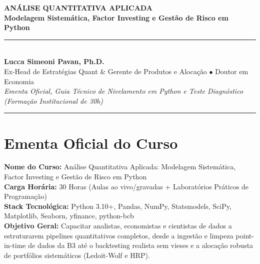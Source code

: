 \documentclass[11pt,a4paper]{article}
\begin{document}
\begin{center}
    {\Huge \textbf{\color{primarynavy} ANÁLISE QUANTITATIVA APLICADA}}\\[6pt]
    {\Large \textbf{\color{accentblue} Modelagem Sistemática, Factor Investing e Gestão de Risco em Python}}\\[10pt]
    \rule{\textwidth}{1.5pt}\\[8pt]
    {\normalsize \textbf{Lucca Simeoni Pavan, Ph.D.}}\\
    {\small Ex-Head de Estratégias Quant \& Gerente de Produtos e Alocação $\bullet$ Doutor em Economia}\\
    {\small \textit{Ementa Oficial, Guia Técnico de Nivelamento em Python e Teste Diagnóstico (Formação Institucional de 30h)}}\\[4pt]
    \rule{\textwidth}{0.8pt}
\end{center}

\vspace{10pt}

\section{Ementa Oficial do Curso}

\begin{infobox}
\textbf{Nome do Curso:} Análise Quantitativa Aplicada: Modelagem Sistemática, Factor Investing e Gestão de Risco em Python\\
\textbf{Carga Horária:} 30 Horas (Aulas ao vivo/gravadas + Laboratórios Práticos de Programação)\\
\textbf{Stack Tecnológica:} Python 3.10+, Pandas, NumPy, Statsmodels, SciPy, Matplotlib, Seaborn, yfinance, python-bcb\\
\textbf{Objetivo Geral:} Capacitar analistas, economistas e cientistas de dados a estruturarem pipelines quantitativos completos, desde a ingestão e limpeza point-in-time de dados da B3 até o backtesting realista sem vieses e a alocação robusta de portfólios sistemáticos (Ledoit-Wolf e HRP).
\end{infobox}
\end{document}

